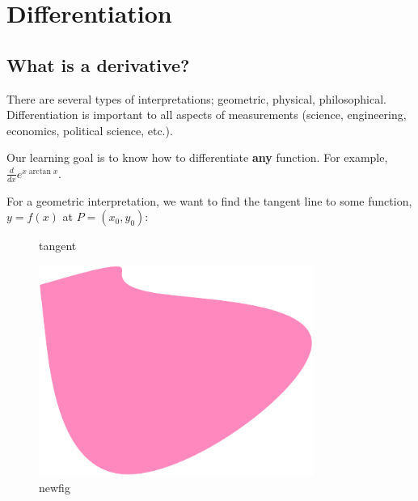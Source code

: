 \documentclass{article}
\begin{document}

\section{Differentiation}


\subsection{What is a derivative?}

There are several types of interpretations; geometric, physical, philosophical. Differentiation is important to all aspects of measurements (science, engineering, economics, political science, etc.). 

Our learning goal is to know how to differentiate \textbf{any} function. For example,$ \frac{d}{dx}e^{x\arctan x}$. 

For a geometric interpretation, we want to find the tangent line to some function, \( y=f(x) \) at \( P = (x_{0},y_{0}) \):

\begin{figure}[ht]
    \centering
    \caption{tangent}
    \label{fig:tangent}
\end{figure}



\begin{figure}[ht]
    \centering
 \includegraphics[width=0.8\textwidth]{./figures/newfig.pdf}
    \caption{newfig}
    \label{fig:newfig}
\end{figure}
\end{document}
